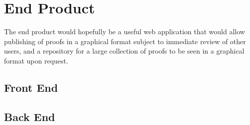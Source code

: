 \documentclass{acm_proc_article-sp}
\begin{document}
\section{End Product}
The end product would hopefully be a useful web application that would
allow publishing of proofs in a graphical format subject to immediate review
of other users, and a repository for a large collection of proofs to be
seen in a graphical format upon request.
\subsection{Front End}
\subsection{Back End}
\end{document}
